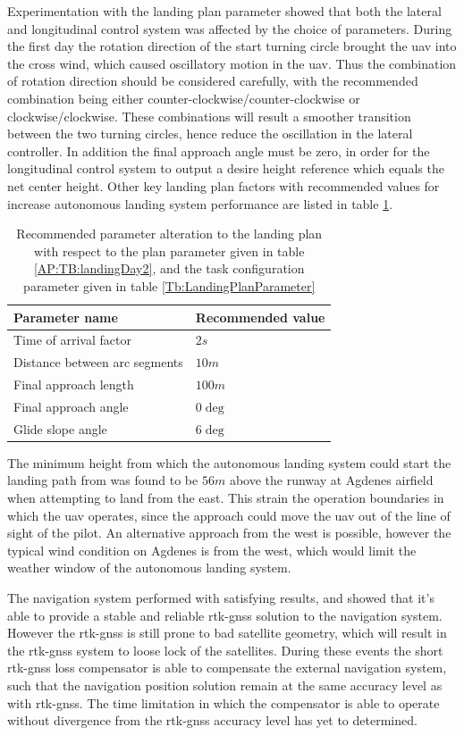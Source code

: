 Experimentation with the landing plan parameter showed that both the lateral and longitudinal control system was affected by the choice of parameters. During the first day the rotation direction of the start turning circle brought the \gls{uav} into the cross wind, which caused oscillatory motion in the \gls{uav}. Thus the combination of rotation direction should be considered carefully, with the recommended combination being either counter-clockwise/counter-clockwise or clockwise/clockwise. These combinations will result a smoother transition between the two turning circles, hence reduce the oscillation in the lateral controller. In addition the final approach angle must be zero, in order for the longitudinal control system to output a desire height reference which equals the net center height. Other key landing plan factors with recommended values for increase autonomous landing system performance are listed in table \ref{Tb:RecommmendedLandingPlanParameter}.
\begin{table}[H]
\centering
\begin{tabular}{| l | l |}
\hline
\textbf{Parameter name}			&  \textbf{Recommended value} 	\\ \hline
Time of arrival factor			&	$2 s$						\\ \hline
Distance between arc segments	&	$10 m$					 	\\ \hline
Final approach length			&	$100 m$					 	\\ \hline
Final approach angle			&   $0 \deg$					\\ \hline
Glide slope angle				&	$6 \deg$				 	\\ \hline
\end{tabular}
\caption{Recommended parameter alteration to the landing plan with respect to the plan parameter given in table \ref{AP:TB:landingDay2}, and the task configuration parameter given in table \ref{Tb:LandingPlanParameter}}
\label{Tb:RecommmendedLandingPlanParameter}
\end{table}
The minimum height from which the autonomous landing system could start the landing path from was found to be $56 m$ above the runway at Agdenes airfield when attempting to land from the east. This strain the operation boundaries in which the \gls{uav} operates, since the approach could move the \gls{uav} out of the line of sight of the pilot. An alternative approach from the west is possible, however the typical wind condition on Agdenes is from the west, which would limit the weather window of the autonomous landing system.

The navigation system performed with satisfying results, and showed that it's able to provide a stable and reliable \gls{rtk-gnss} solution to the navigation system. However the \gls{rtk-gnss} is still prone to bad satellite geometry, which will result in the \gls{rtk-gnss} system to loose lock of the satellites. During these events the short \gls{rtk-gnss} loss compensator is able to compensate the external navigation system, such that the navigation position solution remain at the same accuracy level as with \gls{rtk-gnss}. The time limitation in which the compensator is able to operate without divergence from the \gls{rtk-gnss} accuracy level has yet to determined.